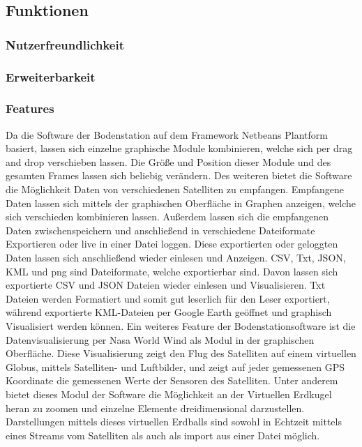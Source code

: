 \subsection{Funktionen}
\subsubsection{Nutzerfreundlichkeit}

\subsubsection{Erweiterbarkeit}

\subsubsection{Features}
Da die Software der Bodenstation auf dem Framework Netbeans Plantform basiert, lassen sich einzelne graphische Module kombinieren, welche sich per drag and drop verschieben lassen. Die Größe und Position dieser Module und des gesamten Frames lassen sich beliebig verändern. Des weiteren bietet die Software die Möglichkeit Daten von verschiedenen Satelliten zu empfangen. Empfangene Daten lassen sich mittels der graphischen Oberfläche in Graphen anzeigen, welche sich verschieden kombinieren lassen. Außerdem lassen sich die empfangenen Daten zwischenspeichern und anschließend in verschiedene Dateiformate Exportieren oder live in einer Datei loggen. Diese exportierten oder geloggten Daten lassen sich anschließend wieder einlesen und Anzeigen. CSV, Txt, JSON, KML und png sind Dateiformate, welche exportierbar sind. Davon lassen sich exportierte CSV und JSON Dateien wieder einlesen und Visualisieren. Txt Dateien werden Formatiert und somit gut leserlich für den Leser exportiert, während exportierte KML-Dateien per Google Earth geöffnet und graphisch Visualisiert werden können. Ein weiteres Feature der Bodenstationsoftware ist die Datenvisualisierung per Nasa World Wind als Modul in der graphischen Oberfläche. Diese Visualisierung zeigt den Flug des Satelliten auf einem virtuellen Globus, mittels Satelliten- und Luftbilder, und zeigt auf jeder gemessenen GPS Koordinate die gemessenen Werte der Sensoren des Satelliten. Unter anderem bietet dieses Modul der Software die Möglichkeit an der Virtuellen Erdkugel heran zu zoomen und einzelne Elemente dreidimensional darzustellen. Darstellungen mittels dieses virtuellen Erdballs sind sowohl in Echtzeit mittels eines Streams vom Satelliten als auch als import aus einer Datei möglich.
